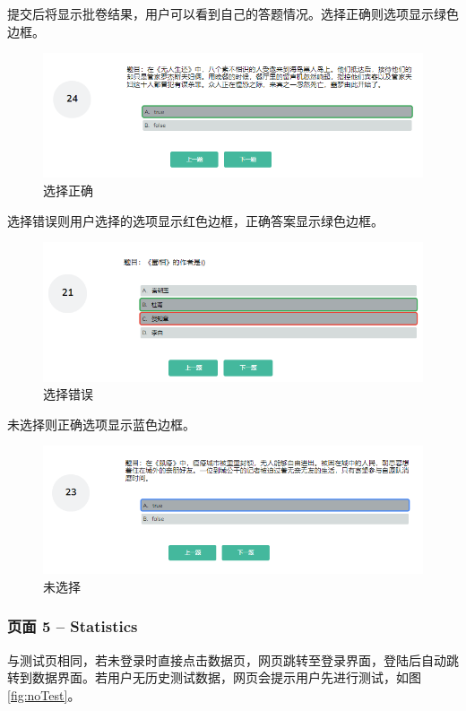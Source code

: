 \documentclass[twoside,11pt]{article}
\begin{document}
提交后将显示批卷结果，用户可以看到自己的答题情况。选择正确则选项显示绿色边框。

\begin{figure}[H]
    \centering
    \includegraphics[width=0.8\columnwidth]{figures/testRight.png}
    \caption{选择正确}\label{fig:testRight}
\end{figure}

选择错误则用户选择的选项显示红色边框，正确答案显示绿色边框。

\begin{figure}[H]
    \centering
    \includegraphics[width=0.8\columnwidth]{figures/testError.png}
    \caption{选择错误}\label{fig:testError}
\end{figure}

未选择则正确选项显示蓝色边框。

\begin{figure}[H]
    \centering
    \includegraphics[width=0.8\columnwidth]{figures/testEmpty.png}
    \caption{未选择}\label{fig:testEmpty}
\end{figure}

\subsubsection{页面 5 -- Statistics}

与测试页相同，若未登录时直接点击数据页，网页跳转至登录界面，登陆后自动跳转到数据界面。若用户无历史测试数据，网页会提示用户先进行测试，如图\ref{fig:noTest}。
\end{document}
